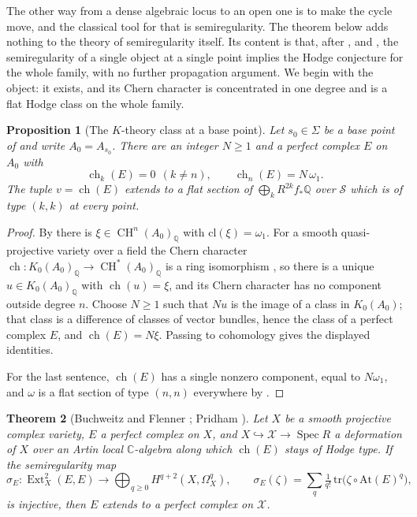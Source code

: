 \documentclass[11pt,reqno]{amsart}
\theoremstyle{plain}
\newtheorem{theorem}{Theorem}[section]
\newtheorem{proposition}[theorem]{Proposition}
\theoremstyle{definition}
\theoremstyle{remark}
\newcommand{\QQ}{\mathbb{Q}}
\newcommand{\CC}{\mathbb{C}}
\newcommand{\cS}{\mathcal{S}}
\newcommand{\cX}{\mathcal{X}}
\newcommand{\cl}{\mathrm{cl}}
\DeclareMathOperator{\CH}{CH}
\DeclareMathOperator{\ch}{ch}
\DeclareMathOperator{\Ext}{Ext}
\DeclareMathOperator{\Spec}{Spec}
\begin{document}
The other way from a dense algebraic locus to an open one is to make the
cycle move, and the classical tool for that is semiregularity. The theorem
below adds nothing to the theory of semiregularity itself. Its content is
that, after \cite[Theorem~4.14]{paperI}, \cite[Theorem~15.27]{paperI} and
\cite[Theorem~16.4]{paperI}, the semiregularity of a single object at a single
point implies the Hodge conjecture for the whole family, with no further
propagation argument. We begin with the object: it exists, and its Chern
character is concentrated in one degree and is a flat Hodge class on the
whole family.

\begin{proposition}[The $K$-theory class at a base point]\label{prop:ktheory}
Let $s_{0}\in\Sigma$ be a base point of \cite[Theorem~15.27]{paperI} and write
$A_{0}=A_{s_{0}}$. There are an integer $N\ge1$ and a perfect complex $E$ on
$A_{0}$ with
\[
  \ch_{k}(E)=0\ \ (k\ne n),\qquad \ch_{n}(E)=N\,\omega_{1} .
\]
The tuple $v=\ch(E)$ extends to a flat section of
$\bigoplus_{k}R^{2k}f_{*}\QQ$ over $\cS$ which is of type $(k,k)$ at every
point.
\end{proposition}

\begin{proof}
By \cite[Theorem~15.27]{paperI} there is $\xi\in\CH^{n}(A_{0})_{\QQ}$ with
$\cl(\xi)=\omega_{1}$. For a smooth quasi-projective variety over a field the
Chern character $\ch\colon K_{0}(A_{0})_{\QQ}\to\CH^{*}(A_{0})_{\QQ}$ is a
ring isomorphism \cite[Ex.~15.2.16(b) and Cor.~18.3.2]{Ful98}, so there is a
unique $u\in K_{0}(A_{0})_{\QQ}$ with $\ch(u)=\xi$, and its Chern character
has no component outside degree $n$. Choose $N\ge1$ such that $Nu$ is the
image of a class in $K_{0}(A_{0})$; that class is a difference of classes of
vector bundles, hence the class of a perfect complex $E$, and
$\ch(E)=N\xi$. Passing to cohomology gives the displayed identities.

For the last sentence, $\ch(E)$ has a single nonzero component, equal to
$N\omega_{1}$, and $\omega$ is a flat section of type $(n,n)$ everywhere by
\cite[Lemma~16.2]{paperI}.
\end{proof}

\begin{theorem}[Buchweitz and Flenner \cite{BF03}; Pridham \cite{Pri24}]\label{thm:BF}
Let $X$ be a smooth projective complex variety, $E$ a perfect complex on $X$,
and $X\hookrightarrow\cX\to\Spec R$ a deformation of $X$ over an Artin local
$\CC$-algebra along which $\ch(E)$ stays of Hodge type. If the semiregularity
map
\[
  \sigma_{E}\colon\Ext^{2}_{X}(E,E)
  \longrightarrow\bigoplus_{q\ge0}H^{q+2}(X,\Omega^{q}_{X}),
  \qquad
  \sigma_{E}(\zeta)=\sum_{q}\tfrac{1}{q!}\,
    \mathrm{tr}\bigl(\zeta\circ\mathrm{At}(E)^{q}\bigr),
\]
is injective, then $E$ extends to a perfect complex on $\cX$.
\end{theorem}
\end{document}
